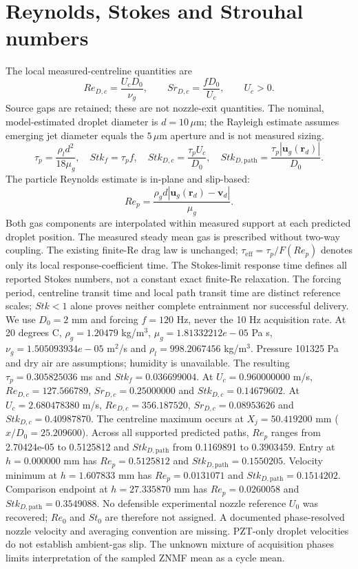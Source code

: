 \section{Reynolds, Stokes and Strouhal numbers}
The local measured-centreline quantities are
\begin{equation}Re_{D,c}=\frac{U_c D_0}{\nu_g},\qquad Sr_{D,c}=\frac{fD_0}{U_c},\qquad U_c>0.\end{equation}
Source gaps are retained; these are not nozzle-exit quantities.
The nominal, model-estimated droplet diameter is $d=10\,\mu\mathrm m$;
the Rayleigh estimate assumes emerging jet diameter equals the $5\,\mu\mathrm m$ aperture and is not measured sizing.
\begin{equation}\tau_p=\frac{\rho_l d^2}{18\mu_g},\quad Stk_f=\tau_p f,\quad Stk_{D,c}=\frac{\tau_p U_c}{D_0},\quad Stk_{D,\mathrm{path}}=\frac{\tau_p|\mathbf u_g(\mathbf r_d)|}{D_0}.\end{equation}
The particle Reynolds estimate is in-plane and slip-based:
\begin{equation}Re_p=\frac{\rho_g d|\mathbf u_g(\mathbf r_d)-\mathbf v_d|}{\mu_g}.\end{equation}
Both gas components are interpolated within measured support at each predicted droplet position.
The measured steady mean gas is prescribed without two-way coupling. The existing finite-Re drag law is unchanged;
$\tau_{\mathrm{eff}}=\tau_p/F(Re_p)$ denotes only its local response-coefficient time.
The Stokes-limit response time defines all reported Stokes numbers, not a constant exact finite-Re relaxation.
The forcing period, centreline transit time and local path transit time are distinct reference scales;
$Stk<1$ alone proves neither complete entrainment nor successful delivery.
We use $D_0=2$ mm and forcing $f=120$ Hz, never the 10 Hz acquisition rate. At 20 degrees C, $\rho_g=1.20479$ kg/m$^3$, $\mu_g=1.81332212e-05$ Pa s, $\nu_g=1.505093934e-05$ m$^2$/s and $\rho_l=998.2067456$ kg/m$^3$. Pressure 101325 Pa and dry air are assumptions; humidity is unavailable. The resulting $\tau_p=0.305825036$ ms and $Stk_f=0.036699004$. At $U_c=0.960000000$ m/s, $Re_{D,c}=127.566789$, $Sr_{D,c}=0.25000000$ and $Stk_{D,c}=0.14679602$. At $U_c=2.680478380$ m/s, $Re_{D,c}=356.187520$, $Sr_{D,c}=0.08953626$ and $Stk_{D,c}=0.40987870$. The centreline maximum occurs at $X_j=50.419200$ mm ($x/D_0=25.209600$). Across all supported predicted paths, $Re_p$ ranges from 2.70424e-05 to 0.5125812 and $Stk_{D,\mathrm{path}}$ from 0.1169891 to 0.3903459. Entry at $h=0.000000$ mm has $Re_p=0.5125812$ and $Stk_{D,\mathrm{path}}=0.1550205$. Velocity minimum at $h=1.607833$ mm has $Re_p=0.0131071$ and $Stk_{D,\mathrm{path}}=0.1514202$. Comparison endpoint at $h=27.335870$ mm has $Re_p=0.0260058$ and $Stk_{D,\mathrm{path}}=0.3549088$. No defensible experimental nozzle reference $U_0$ was recovered; $Re_0$ and $St_0$ are therefore not assigned. A documented phase-resolved nozzle velocity and averaging convention are missing. PZT-only droplet velocities do not establish ambient-gas slip. The unknown mixture of acquisition phases limits interpretation of the sampled ZNMF mean as a cycle mean.